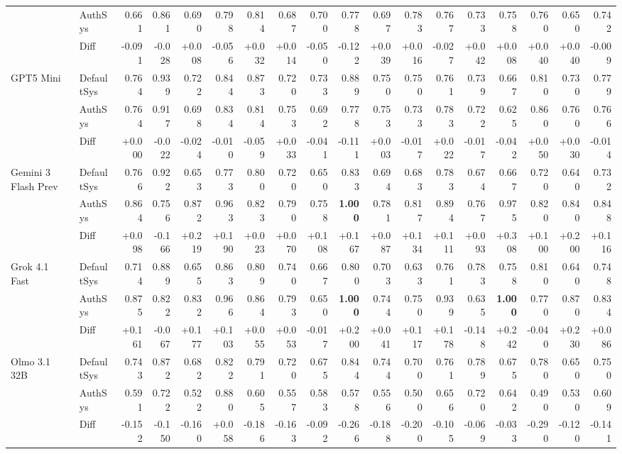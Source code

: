 \begin{table}[htbp]
{\begin{tabular}{llrrrrrrrrrrrrrrrr}
 & AuthSys & 0.661 & 0.861 & 0.690 & 0.798 & 0.814 & 0.687 & 0.700 & 0.778 & 0.697 & 0.783 & 0.767 & 0.733 & 0.758 & 0.760 & 0.650 & 0.742 \\
\rowcolor{Gray} & Diff & -0.091 & -0.028 & +0.008 & -0.056 & +0.032 & +0.014 & -0.050 & -0.122 & +0.039 & +0.016 & -0.027 & +0.042 & +0.008 & +0.040 & +0.040 & -0.009 \\
GPT5 Mini & DefaultSys & 0.764 & 0.939 & 0.722 & 0.844 & 0.873 & 0.720 & 0.733 & 0.889 & 0.750 & 0.750 & 0.761 & 0.739 & 0.667 & 0.810 & 0.730 & 0.779 \\
 & AuthSys & 0.764 & 0.917 & 0.698 & 0.834 & 0.814 & 0.753 & 0.692 & 0.778 & 0.753 & 0.733 & 0.783 & 0.722 & 0.625 & 0.860 & 0.760 & 0.766 \\
\rowcolor{Gray} & Diff & +0.000 & -0.022 & -0.024 & -0.010 & -0.059 & +0.033 & -0.041 & -0.111 & +0.003 & -0.017 & +0.022 & -0.017 & -0.042 & +0.050 & +0.030 & -0.014 \\
Gemini 3 Flash Prev & DefaultSys & 0.766 & 0.922 & 0.653 & 0.773 & 0.800 & 0.720 & 0.650 & 0.833 & 0.694 & 0.683 & 0.783 & 0.674 & 0.667 & 0.720 & 0.640 & 0.732 \\
 & AuthSys & 0.864 & 0.756 & 0.872 & 0.963 & 0.823 & 0.790 & 0.758 & \textbf{1.000} & 0.781 & 0.817 & 0.894 & 0.767 & 0.975 & 0.820 & 0.840 & 0.848 \\
\rowcolor{Gray} & Diff & +0.098 & -0.166 & +0.219 & +0.190 & +0.023 & +0.070 & +0.108 & +0.167 & +0.087 & +0.134 & +0.111 & +0.093 & +0.308 & +0.100 & +0.200 & +0.116 \\
Grok 4.1 Fast & DefaultSys & 0.714 & 0.889 & 0.655 & 0.863 & 0.809 & 0.740 & 0.667 & 0.800 & 0.703 & 0.633 & 0.761 & 0.783 & 0.758 & 0.810 & 0.640 & 0.748 \\
 & AuthSys & 0.875 & 0.822 & 0.832 & 0.966 & 0.864 & 0.793 & 0.650 & \textbf{1.000} & 0.744 & 0.750 & 0.939 & 0.635 & \textbf{1.000} & 0.770 & 0.870 & 0.834 \\
\rowcolor{Gray} & Diff & +0.161 & -0.067 & +0.177 & +0.103 & +0.055 & +0.053 & -0.017 & +0.200 & +0.041 & +0.117 & +0.178 & -0.148 & +0.242 & -0.040 & +0.230 & +0.086 \\
Olmo 3.1 32B & DefaultSys & 0.743 & 0.872 & 0.682 & 0.822 & 0.791 & 0.720 & 0.675 & 0.844 & 0.744 & 0.700 & 0.761 & 0.789 & 0.675 & 0.780 & 0.650 & 0.750 \\
 & AuthSys & 0.591 & 0.722 & 0.522 & 0.880 & 0.605 & 0.557 & 0.583 & 0.578 & 0.556 & 0.500 & 0.656 & 0.720 & 0.642 & 0.490 & 0.530 & 0.609 \\
\rowcolor{Gray} & Diff & -0.152 & -0.150 & -0.160 & +0.058 & -0.186 & -0.163 & -0.092 & -0.266 & -0.188 & -0.200 & -0.105 & -0.069 & -0.033 & -0.290 & -0.120 & -0.141 \\

\end{tabular}}
\end{table}

